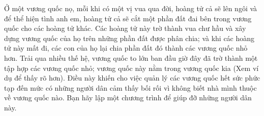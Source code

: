 Ở một vương quốc nọ, mỗi khi có một vị vua qua đời, hoàng tử cả sẽ lên ngôi và để thể hiện tình anh em, hoàng tử cả sẽ cắt một phần đất đai bên trong vương quốc cho các hoàng tử khác. Các hoàng tử này trờ thành vua chư hầu và xây dựng vương quốc của họ trên những phần đất được phân chia; và khi các hoàng tử này mất đi, các con của họ lại chia phần đất đó thành các vương quốc nhỏ hơn. Trải qua nhiều thế hệ, vương quốc to lớn ban đầu giờ đây đã trờ thành một tập hợp các vương quốc nhỏ; vương quốc này nằm trong vương quốc kia (Xem ví dụ để thấy rõ hơn). Điều này khiến cho việc quản lý các vương quốc hết sức phức tạp đến mức có những người dân cảm thấy bối rối vì không biết nhà mình thuộc về vương quốc nào. Bạn hãy lập một chương trình để giúp đỡ những người dân này.  

\